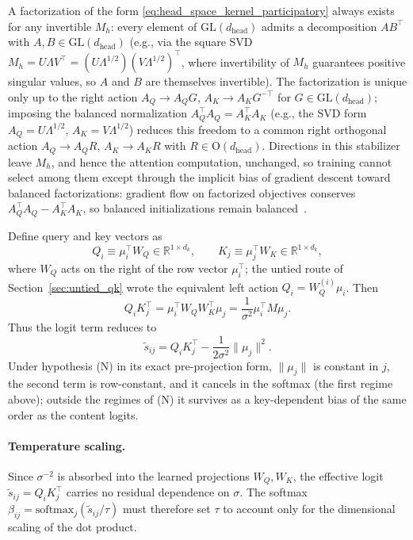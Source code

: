 \documentclass[11pt]{article}
\begin{document}
A factorization of the form \eqref{eq:head_space_kernel_participatory} always exists for any invertible $M_h$: every element of $\mathrm{GL}(d_{\text{head}})$ admits a decomposition $A B^\top$ with $A, B \in \mathrm{GL}(d_{\text{head}})$ (e.g., via the square SVD $M_h = U\Lambda V^\top = (U\Lambda^{1/2})(V\Lambda^{1/2})^\top$, where invertibility of $M_h$ guarantees positive singular values, so $A$ and $B$ are themselves invertible). The factorization is unique only up to the right action $A_Q \to A_Q G$, $A_K \to A_K G^{-\top}$ for $G \in \mathrm{GL}(d_{\text{head}})$; imposing the balanced normalization $A_Q^\top A_Q = A_K^\top A_K$ (e.g., the SVD form $A_Q = U\Lambda^{1/2}$, $A_K = V\Lambda^{1/2}$) reduces this freedom to a common right orthogonal action $A_Q \to A_Q R$, $A_K \to A_K R$ with $R \in \mathrm{O}(d_{\text{head}})$. Directions in this stabilizer leave $M_h$, and hence the attention computation, unchanged, so training cannot select among them except through the implicit bias of gradient descent toward balanced factorizations: gradient flow on factorized objectives conserves $A_Q^\top A_Q - A_K^\top A_K$, so balanced initializations remain balanced~\cite{du2018balanced, arora2018implicit}.

Define query and key vectors as
\begin{equation}
Q_i \equiv \mu_i^\top W_Q \in \mathbb{R}^{1\times d_k}, \qquad K_j \equiv \mu_j^\top W_K \in \mathbb{R}^{1\times d_k},
\end{equation}
where $W_Q$ acts on the right of the row vector $\mu_i^\top$; the untied route of Section~\ref{sec:untied_qk} wrote the equivalent left action $Q_i = W_Q^{(i)}\mu_i$. Then
\begin{equation}
Q_i K_j^\top = \mu_i^\top W_Q W_K^\top \mu_j = \frac{1}{\sigma^2}\mu_i^\top M \mu_j.
\end{equation}
Thus the logit term reduces to
\begin{equation}
\tilde{s}_{ij} = Q_i K_j^\top - \frac{1}{2\sigma^2}\|\mu_j\|^2.
\end{equation}
Under hypothesis (N) in its exact pre-projection form, $\|\mu_j\|$ is constant in $j$, the second term is row-constant, and it cancels in the softmax (the first regime above); outside the regimes of (N) it survives as a key-dependent bias of the same order as the content logits.

\paragraph{Temperature scaling.}
Since $\sigma^{-2}$ is absorbed into the learned projections $W_Q, W_K$, the effective logit $\tilde{s}_{ij} = Q_i K_j^\top$ carries no residual dependence on $\sigma$. The softmax $\beta_{ij} = \mathrm{softmax}_j(\tilde{s}_{ij}/\tau)$ must therefore set $\tau$ to account only for the dimensional scaling of the dot product.
\end{document}
